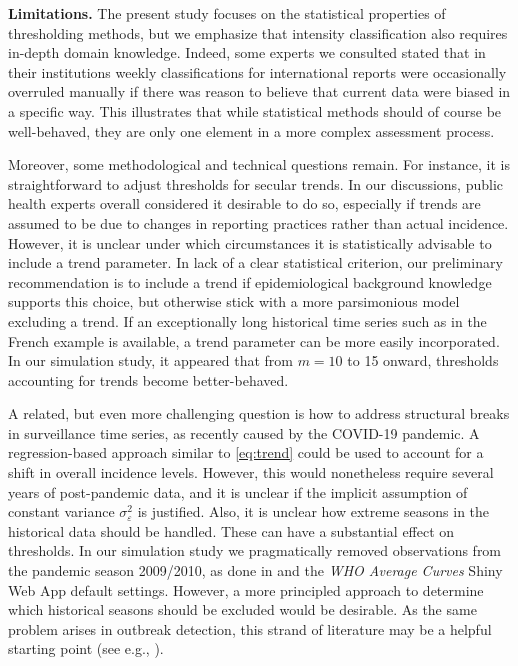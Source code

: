 \documentclass[12pt]{article}
\begin{document}
\noindent \textbf{Limitations.} The present study focuses on the statistical properties of thresholding methods, but we emphasize that intensity classification also requires in-depth domain knowledge. Indeed, some experts we consulted stated that in their institutions weekly classifications for international reports were occasionally overruled manually if there was reason to believe that current data were biased in a specific way. This illustrates that while statistical methods should of course be well-behaved, they are only one element in a more complex assessment process.

Moreover, some methodological and technical questions remain. For instance, it is straightforward to adjust thresholds for secular trends. In our discussions, public health experts overall considered it desirable to do so, especially if trends are assumed to be due to changes in reporting practices rather than actual incidence. However, it is unclear under which circumstances it is statistically advisable to include a trend parameter. In lack of a clear statistical criterion, our preliminary recommendation is to include a trend if epidemiological background knowledge supports this choice, but otherwise stick with a more parsimonious model excluding a trend. If an exceptionally long historical time series such as in the French example is available, a trend parameter can be more easily incorporated. In our simulation study, it appeared that from $m = 10$ to 15 onward, thresholds accounting for trends become better-behaved.

A related, but even more challenging question is how to address structural breaks in surveillance time series, as recently caused by the COVID-19 pandemic. A regression-based approach similar to \eqref{eq:trend} could be used to account for a shift in overall incidence levels. However, this would nonetheless require several years of post-pandemic data, and it is unclear if the implicit assumption of constant variance $\sigma^2_\varepsilon$ is justified. Also, it is unclear how extreme seasons in the historical data should be handled. These can have a substantial effect on thresholds. In our simulation study we pragmatically removed observations from the pandemic season 2009/2010, as done in \cite{Vega2015} and the \textit{WHO Average Curves} Shiny Web App default settings. However, a more principled approach to determine which historical seasons should be excluded would be desirable. As the same problem arises in outbreak detection, this strand of literature may be a helpful starting point (see e.g., \citealt{Noufaily2013}).
\end{document}

